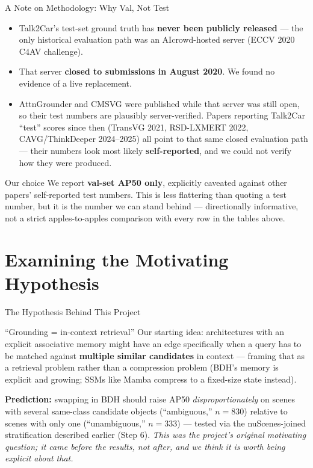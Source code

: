 \documentclass[aspectratio=169]{beamer}
\begin{document}
\begin{frame}{A Note on Methodology: Why Val, Not Test}
  \begin{itemize}
    \item Talk2Car's test-set ground truth has \textbf{never been
      publicly released} — the only historical evaluation path was an
      AIcrowd-hosted server (ECCV 2020 C4AV challenge).
    \item That server \textbf{closed to submissions in August 2020}.
      We found no evidence of a live replacement.
    \item AttnGrounder and CMSVG were published while that server was
      still open, so their test numbers are plausibly server-verified.
      Papers reporting Talk2Car ``test'' scores since then
      (TransVG 2021, RSD-LXMERT 2022, CAVG/ThinkDeeper 2024--2025) all
      point to that same closed evaluation path — their numbers look
      most likely \textbf{self-reported}, and we could not verify how
      they were produced.
  \end{itemize}
  \vspace{0.3cm}
  \begin{block}{Our choice}
    We report \textbf{val-set AP50 only}, explicitly caveated against
    other papers' self-reported test numbers. This is less flattering
    than quoting a test number, but it is the number we can stand
    behind — directionally informative, not a strict apples-to-apples
    comparison with every row in the tables above.
  \end{block}
\end{frame}

\section{Examining the Motivating Hypothesis}

\begin{frame}{The Hypothesis Behind This Project}
  \begin{block}{``Grounding = in-context retrieval''}
    Our starting idea: architectures with an explicit associative
    memory might have an edge specifically when a query has to be
    matched against \textbf{multiple similar candidates} in context —
    framing that as a retrieval problem rather than a compression
    problem (BDH's memory is explicit and growing; SSMs like Mamba
    compress to a fixed-size state instead).
  \end{block}
  \vspace{0.2cm}
  \textbf{Prediction:} swapping in BDH should raise AP50
  \emph{disproportionately} on scenes with several same-class candidate
  objects (``ambiguous,'' $n{=}830$) relative to scenes with only one
  (``unambiguous,'' $n{=}333$) — tested via the nuScenes-joined
  stratification described earlier (Step 6).
  \vspace{0.2cm}
  \small\textit{This was the project's original motivating question; it
  came before the results, not after, and we think it is worth being
  explicit about that.}
\end{frame}
\end{document}
